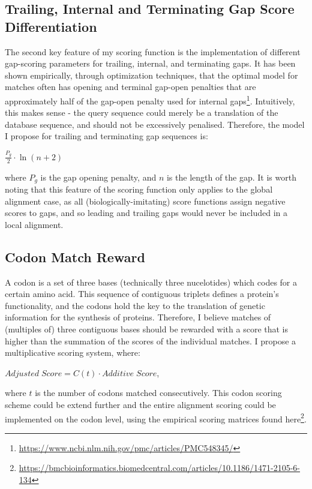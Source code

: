 \documentclass[a4paper]{article}
\begin{document}
\subsection{Trailing, Internal and Terminating Gap Score Differentiation}
The second key feature of my scoring function is the implementation of different gap-scoring parameters for trailing, internal, and terminating gaps. It has been shown empirically, through optimization techniques, that the optimal model for matches often has opening and terminal gap-open penalties that are approximately half of the gap-open penalty used for internal gaps\footnote{\url{https://www.ncbi.nlm.nih.gov/pmc/articles/PMC548345/}}. Intuitively, this makes sense - the query sequence could merely be a translation of the database sequence, and should not be excessively penalised. Therefore, the model I propose for trailing and terminating gap sequences is:
\begin{center}
$\frac{P_g}{2} \cdot \ln(n + 2) $
\end {center}
where $P_g$ is the gap opening penalty, and $n$ is the length of the gap.
 It is worth noting that this feature of the scoring function only applies to the global alignment case, as all (biologically-imitating) score functions assign negative scores to gaps, and so leading and trailing gaps would never be included in a local alignment. 
 
\subsection{Codon Match Reward}
A codon is a set of three bases (technically three nucelotides) which codes for a certain amino acid. This sequence of contiguous triplets defines a protein's functionality, and the codons hold the key to the translation of genetic information for the synthesis of proteins. Therefore, I believe matches of (multiples of) three contiguous bases should be rewarded with a score that is higher than the summation of the scores of the individual matches. I propose a multiplicative scoring system, where:
\begin{center}
$Adjusted\;Score = C(t) \cdot Additive\;Score $,
\end {center}
where $t$ is the number of codons matched consecutively. This codon scoring scheme could be extend further and the entire alignment scoring could be implemented on the codon level, using the empirical scoring matrices found here\footnote{\url{https://bmcbioinformatics.biomedcentral.com/articles/10.1186/1471-2105-6-134}}.
\end{document}
